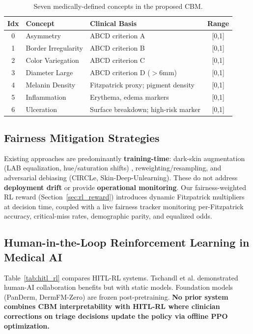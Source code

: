 \documentclass[12pt,a4paper]{article}
\begin{document}
\begin{table}[htbp]
\centering
\caption{Seven medically-defined concepts in the proposed CBM.}
\label{tab:concepts}
\begin{tabular}{cllc}
\toprule
\textbf{Idx} & \textbf{Concept} & \textbf{Clinical Basis} & \textbf{Range} \\
\midrule
0 & Asymmetry & ABCD criterion A & [0,1] \\
1 & Border Irregularity & ABCD criterion B & [0,1] \\
2 & Color Variegation & ABCD criterion C & [0,1] \\
3 & Diameter Large & ABCD criterion D ($>$6mm) & [0,1] \\
4 & Melanin Density & Fitzpatrick proxy; pigment density & [0,1] \\
5 & Inflammation & Erythema, edema markers & [0,1] \\
6 & Ulceration & Surface breakdown; high-risk marker & [0,1] \\
\bottomrule
\end{tabular}
\end{table}

\subsection{Fairness Mitigation Strategies}

Existing approaches are predominantly \textbf{training-time}: dark-skin augmentation (LAB equalization, hue/saturation shifts) \cite{datasetEquity}, reweighting/resampling, and adversarial debiasing (CIRCLe, Skin-Deep-Unlearning). These do not address \textbf{deployment drift} or provide \textbf{operational monitoring}. Our fairness-weighted RL reward (Section~\ref{sec:rl_reward}) introduces dynamic Fitzpatrick multipliers at decision time, coupled with a live fairness tracker monitoring per-Fitzpatrick accuracy, critical-miss rates, demographic parity, and equalized odds.

\subsection{Human-in-the-Loop Reinforcement Learning in Medical AI}

Table~\ref{tab:hitl_rl} compares HITL-RL systems. Tschandl et al. \cite{tschandl2020human} demonstrated human-AI collaboration benefits but with static models. Foundation models (PanDerm, DermFM-Zero) are frozen post-pretraining. \textbf{No prior system combines CBM interpretability with HITL-RL where clinician corrections on triage decisions update the policy via offline PPO optimization.}
\end{document}
